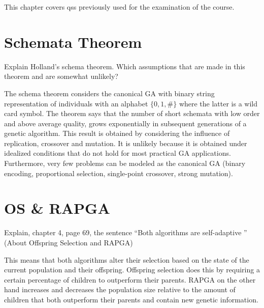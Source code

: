 \documentclass[../main.tex]{subfiles}
\begin{document}
This chapter covers qss previously used for the examination of the course.

\section{Schemata Theorem}

\begin{question}
Explain Holland's schema theorem. Which assumptions that are made in this theorem and are somewhat unlikely?
\end{question}
\begin{solution}
The schema theorem considers the canonical GA with binary string representation of individuals with an
    alphabet $\{0,1,\#\}$ where the latter is a wild card symbol. The theorem says that the number of short schemata
    with low order and above average quality, grows exponentially in subsequent generations of a genetic algorithm.
    This result is obtained by considering the influence of replication, crossover and mutation. It is unlikely because
    it is obtained under idealized conditions that do not hold for most practical GA applications. Furthermore, very
    few problems can be modeled as the canonical GA (binary encoding, proportional selection, single-point crossover,
    strong mutation).
\end{solution}

\section{OS \& RAPGA}
\begin{question}
Explain, chapter 4, page 69, the sentence ``Both algorithms are self-adaptive \textellipsis'' (About Offspring
Selection and RAPGA)
\end{question}
\begin{solution}
This means that both algorithms alter their selection based on the state of the current population and their offspring.
Offspring selection does this by requiring a certain percentage of children to outperform their parents. RAPGA on the
other hand increases and decreases the population size relative to the amount of children that both outperform their
parents and contain new genetic information.
\end{solution}
\end{document}
